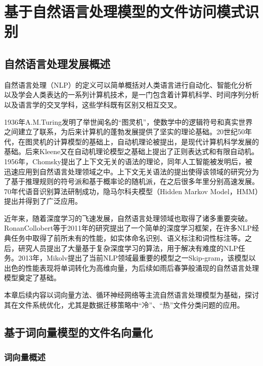 \chapter{基于自然语言处理模型的文件访问模式识别}
\section{自然语言处理发展概述}
自然语言处理（NLP）的定义可以简单概括对人类语言进行自动化、智能化分析以及学会人类表达的一系列计算机技术，是一门包含着计算机科学、时间序列分析以及语言学的交叉学科，这些学科既有区别又相互交叉。

1936年A.M.Turing发明了举世闻名的“图灵机”，使数学中的逻辑符号和真实世界之间建立了联系，为后来计算机的蓬勃发展提供了坚实的理论基础。20世纪50年代，在图灵机的计算模型的基础上，自动机理论被提出，是现代计算机科学发展的基础\cite{自然语言处理的历史与现状}。后来Kleene又在自动机理论模型之基础上提出了正则表达式和有限自动机。1956年，Chomsky提出了上下文无关的语法的理论，同年人工智能被发明后，被迅速应用到自然语言处理领域之中。上下文无关语法的提出使得该领域的研究分为了基于推理规则的符号派和基于概率论的随机派\cite{宋一凡2019自然语言处理的发展历史与现状}，在之后很多年里分别高速发展。70年代语音识别算法研制成功，隐马尔科夫模型（Hidden Markov Model，HMM）提出并得到了广泛应用\cite{自然语言处理的历史与现状}。

近年来，随着深度学习的飞速发展，自然语言处理领域也取得了诸多重要突破。RonanCollobert等\cite{Natural_language_processing_(almost)_from_scratch}于2011年的研究提出了一个简单的深度学习框架，在许多NLP经典任务中取得了前所未有的性能，如实体命名识别、语义标注和词性标注等。之后，研究人员提出了大量基于复杂深度学习的算法，用于解决有难度的NLP任务。2013年，Mikolv\cite{skipgram}提出了当前NLP领域最重要的模型之一Skip-gram，该模型以出色的性能表现将单词转化为高维向量，为后续如雨后春笋般涌现的自然语言处理模型奠定了基础。

本章后续内容以词向量方法、循环神经网络等主流自然语言处理模型为基础，探讨其在文件系统优化，尤其是数据迁移策略中“冷”、“热”文件分类问题的应用。

\section{基于词向量模型的文件名向量化}
\subsection{词向量概述}
